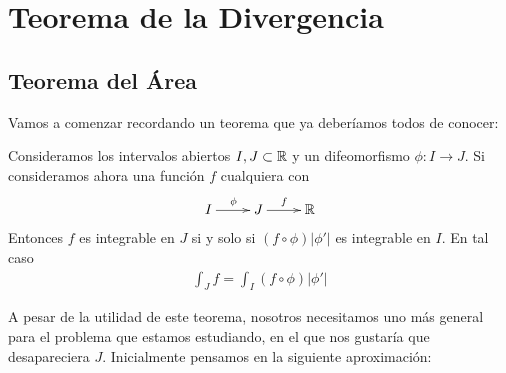 \section{Teorema de la Divergencia}

\subsection{Teorema del Área}

Vamos a comenzar recordando un teorema que ya deberíamos todos de conocer:

\begin{teo}\label{teo:cambio_variable}
    Consideramos los intervalos abiertos $I,J\subset \mathbb{R}$ y un difeomorfismo $\phi : I \to J$. Si consideramos ahora una función $f$ cualquiera con
    \begin{gather*}
        \xymatrix{
            I \ar[r]^\phi & J \ar[r]^f & \bb{R}
        }
    \end{gather*}
    Entonces $f$ es integrable en $J$ si y solo si $(f\circ \phi)|\phi'|$ es integrable en $I$. En tal caso
    \begin{gather*}
        \int_J f = \int_I (f \circ \phi)|\phi'|
    \end{gather*}
\end{teo}

A pesar de la utilidad de este teorema, nosotros necesitamos uno más general para el problema que estamos estudiando, en el que nos gustaría que desapareciera $J$. Inicialmente pensamos en la siguiente aproximación:\\

